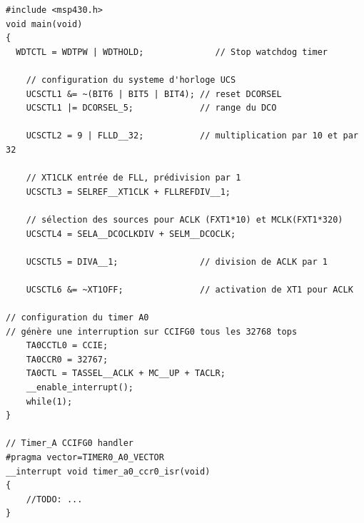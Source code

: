 \lstset{style=customc}
\begin{lstlisting}
#include <msp430.h>
void main(void)
{
  WDTCTL = WDTPW | WDTHOLD;              // Stop watchdog timer

	// configuration du systeme d'horloge UCS
	UCSCTL1 &= ~(BIT6 | BIT5 | BIT4); // reset DCORSEL
	UCSCTL1 |= DCORSEL_5;             // range du DCO

	UCSCTL2 = 9 | FLLD__32;           // multiplication par 10 et par 32

	// XT1CLK entrée de FLL, prédivision par 1
	UCSCTL3 = SELREF__XT1CLK + FLLREFDIV__1;

	// sélection des sources pour ACLK (FXT1*10) et MCLK(FXT1*320)
	UCSCTL4 = SELA__DCOCLKDIV + SELM__DCOCLK;

	UCSCTL5 = DIVA__1;                // division de ACLK par 1

	UCSCTL6 &= ~XT1OFF;               // activation de XT1 pour ACLK

// configuration du timer A0
// génère une interruption sur CCIFG0 tous les 32768 tops
	TA0CCTL0 = CCIE;
	TA0CCR0 = 32767;
	TA0CTL = TASSEL__ACLK + MC__UP + TACLR;
	__enable_interrupt();
	while(1);
}

// Timer_A CCIFG0 handler
#pragma vector=TIMER0_A0_VECTOR
__interrupt void timer_a0_ccr0_isr(void)
{
	//TODO: ...
}
\end{lstlisting}
